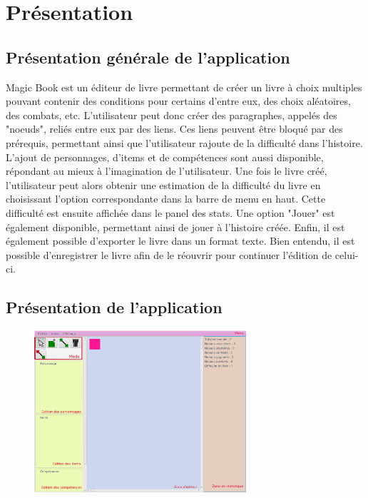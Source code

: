 \chapter{Présentation}

	\section{Présentation générale de l'application}

        Magic Book est un éditeur de livre permettant de créer un livre à choix multiples pouvant contenir des conditions pour certains d'entre eux, des choix aléatoires, des combats, etc. L'utilisateur peut donc créer des paragraphes, appelés des "noeuds", reliés entre eux par des liens. Ces liens peuvent être bloqué par des prérequis, permettant ainsi que l'utilisateur rajoute de la difficulté dans l'histoire. L'ajout de personnages, d'items et de compétences sont aussi disponible, répondant au mieux à l'imagination de l'utilisateur. Une fois le livre créé, l'utilisateur peut alors obtenir une estimation de la difficulté du livre en choisissant l'option correspondante dans la barre de menu en haut. Cette difficulté est ensuite affichée dans le panel des stats. Une option "Jouer" est également disponible, permettant ainsi de jouer à l'histoire créée. Enfin, il est également possible d'exporter le livre dans un format texte. Bien entendu, il est possible d'enregistrer le livre afin de le réouvrir pour continuer l'édition de celui-ci.

	\section{Présentation de l'application}

		\begin{figure}[H]
			\centering\includegraphics[width=0.7\textwidth, keepaspectratio]{img/magicBook.png}
		\end{figure}

